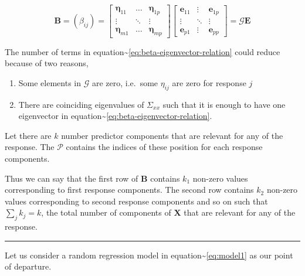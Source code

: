 \documentclass[12pt,A4paper,authoryear]{elsarticle} %
\providecommand{\tightlist}{%
  \setlength{\itemsep}{0pt}\setlength{\parskip}{0pt}}
\begin{document}
\begin{equation}
\mathbf{B} = \left(\beta_{ij}\right) = 
  \begin{bmatrix} 
    \boldsymbol{\eta}_{11} & \ldots & \boldsymbol{\eta}_{1p} \\
    \vdots & \ddots & \vdots \\
    \boldsymbol{\eta}_{m1} & \ldots & \boldsymbol{\eta}_{mp}
  \end{bmatrix} 
  \begin{bmatrix} 
    \mathbf{e}_{11} & \vdots & \mathbf{e}_{1p} \\
    \vdots & \ddots & \vdots \\
    \mathbf{e}_{p1} & \vdots & \mathbf{e}_{pp}
  \end{bmatrix} = \mathcal{G}\mathbf{E}
\label{eq:beta-eigenvector-relation}
\end{equation}

The number of terms in
equation\textasciitilde{}\eqref{eq:beta-eigenvector-relation} could reduce
because of two reasons,

\begin{enumerate}
\def\labelenumi{\alph{enumi})}
\tightlist
\item
  Some elements in \(\mathcal{G}\) are zero, i.e.~some \(\eta_{ij}\) are
  zero for response \(j\)
\item
  There are coinciding eigenvalues of \(\Sigma_{xx}\) such that it is
  enough to have one eigenvector in
  equation\textasciitilde{}\eqref{eq:beta-eigenvector-relation}.
\end{enumerate}

Let there are \(k\) number predictor components that are relevant for
any of the response. The \(\mathcal{P}\) contains the indices of these
position for each response components.

Thus we can say that the first row of \(\mathbf{B}\) contains \(k_1\)
non-zero values corresponding to first response components. The second
row contains \(k_2\) non-zero values corresponding to second response
components and so on such that \(\sum_j{k_j} = k\), the total number of
components of \(\mathbf{X}\) that are relevant for any of the response.

\begin{center}\rule{0.5\linewidth}{\linethickness}\end{center}

Let us consider a random regression model in
equation\textasciitilde{}\eqref{eq:model1} as our point of departure.
\end{document}
